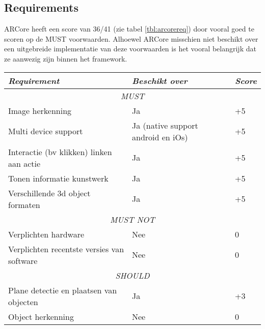 \subsection{Requirements}
ARCore heeft een score van 36/41 (zie tabel \ref{tbl:arcorereq}) door vooral goed te scoren op de MUST voorwaarden. Alhoewel ARCore misschien niet beschikt over een uitgebreide implementatie van deze voorwaarden is het vooral belangrijk dat ze aanwezig zijn binnen het framework.
\begin{table}[]
    \centering
    \begin{tabular}{@{}lll@{}}
        \toprule
        \textit{Requirement}                       & \textit{Beschikt over}             & \textit{Score} \\ \midrule
        \multicolumn{3}{c}{\textit{MUST}}                                                                \\ \midrule
        Image herkenning                           & Ja                                 & +5             \\
        Multi device support                       & Ja (native support android en iOs) & +5             \\
        Interactie (bv klikken) linken aan actie   & Ja                                 & +5             \\
        Tonen informatie kunstwerk                 & Ja                                 & +5             \\
        Verschillende 3d object formaten           & Ja                                 & +5             \\ \midrule
        \multicolumn{3}{c}{\textit{MUST NOT}}                                                            \\ \midrule
        Verplichten hardware                       & Nee                                & 0              \\
        Verplichten recentste versies van software & Nee                                & 0              \\ \midrule
        \multicolumn{3}{c}{\textit{SHOULD}}                                                              \\ \midrule
        Plane detectie en plaatsen van objecten    & Ja                                 & +3             \\
        Object herkenning                          & Nee                                & 0              \\

\end{tabular}
\end{table}
